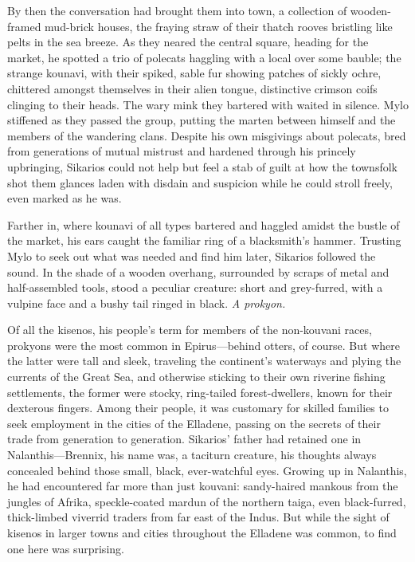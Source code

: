 By then the conversation had brought them into town, a collection of wooden-framed mud-brick houses, the fraying straw of their thatch rooves bristling like pelts in the sea breeze. As they neared the central square, heading for the market, he spotted a trio of polecats haggling with a local over some bauble; the strange kounavi, with their spiked, sable fur showing patches of sickly ochre, chittered amongst themselves in their alien tongue, distinctive crimson coifs clinging to their heads. The wary mink they bartered with waited in silence. Mylo stiffened as they passed the group, putting the marten between himself and the members of the wandering clans. Despite his own misgivings about polecats, bred from generations of mutual mistrust and hardened through his princely upbringing, Sikarios could not help but feel a stab of guilt at how the townsfolk shot them glances laden with disdain and suspicion while he could stroll freely, even marked as he was.

Farther in, where kounavi of all types bartered and haggled amidst the bustle of the market, his ears caught the familiar ring of a blacksmith's hammer. Trusting Mylo to seek out what was needed and find him later, Sikarios followed the sound. In the shade of a wooden overhang, surrounded by scraps of metal and half-assembled tools, stood a peculiar creature: short and grey-furred, with a vulpine face and a bushy tail ringed in black. \emph{A prokyon.}

Of all the kisenos, his people's term for members of the non-kouvani races, prokyons were the most common in Epirus---behind otters, of course. But where the latter were tall and sleek, traveling the continent's waterways and plying the currents of the Great Sea, and otherwise sticking to their own riverine fishing settlements, the former were stocky, ring-tailed forest-dwellers, known for their dexterous fingers. Among their people, it was customary for skilled families to seek employment in the cities of the Elladene, passing on the secrets of their trade from generation to generation. Sikarios' father had retained one in Nalanthis---Brennix, his name was, a taciturn creature, his thoughts always concealed behind those small, black, ever-watchful eyes. Growing up in Nalanthis, he had encountered far more than just kouvani: sandy-haired mankous from the jungles of Afrika, speckle-coated mardun of the northern taiga, even black-furred, thick-limbed viverrid traders from far east of the Indus. But while the sight of kisenos in larger towns and cities throughout the Elladene was common, to find one here was surprising.


